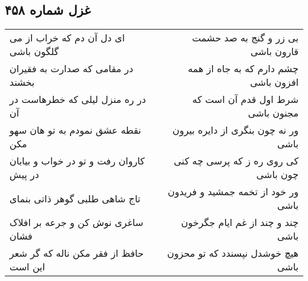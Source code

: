 \begin{center}
\section*{غزل شماره ۴۵۸}
\label{sec:sh458}
\begin{longtable}{l p{0.5cm} r}
ای دل آن دم که خراب از می گلگون باشی
&&
بی زر و گنج به صد حشمت قارون باشی
\\
در مقامی که صدارت به فقیران بخشند
&&
چشم دارم که به جاه از همه افزون باشی
\\
در ره منزل لیلی که خطرهاست در آن
&&
شرط اول قدم آن است که مجنون باشی
\\
نقطه عشق نمودم به تو هان سهو مکن
&&
ور نه چون بنگری از دایره بیرون باشی
\\
کاروان رفت و تو در خواب و بیابان در پیش
&&
کی روی ره ز که پرسی چه کنی چون باشی
\\
تاج شاهی طلبی گوهر ذاتی بنمای
&&
ور خود از تخمه جمشید و فریدون باشی
\\
ساغری نوش کن و جرعه بر افلاک فشان
&&
چند و چند از غم ایام جگرخون باشی
\\
حافظ از فقر مکن ناله که گر شعر این است
&&
هیچ خوشدل نپسندد که تو محزون باشی
\\
\end{longtable}
\end{center}
